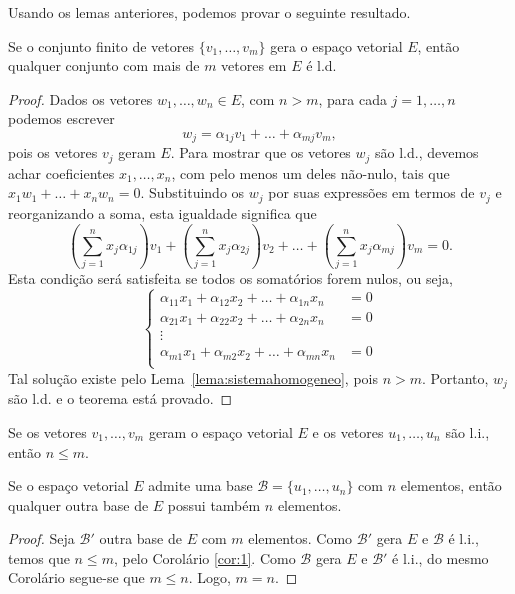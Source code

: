 Usando os lemas anteriores, podemos provar o seguinte resultado.

\begin{teo}\label{teo:33}
  Se o conjunto finito de vetores $\{v_1,\ldots,v_m\}$ gera o espaço vetorial $E$, então qualquer conjunto com mais de $m$ vetores em $E$ é l.d.
\end{teo}
\begin{proof}
Dados os vetores $w_1,\ldots,w_n\in E$, com $n>m$, para cada $j=1,\ldots,n$ podemos escrever
\begin{equation*}
	w_j = \alpha_{1j}v_1 + \ldots + \alpha_{mj}v_m,
\end{equation*}
pois os vetores $v_j$ geram $E$. Para mostrar que os vetores $w_j$ são l.d., devemos achar coeficientes $x_1,\ldots,x_n$, com pelo menos um deles não-nulo, tais que $x_1w_1+\ldots+x_nw_n=0$. Substituindo os $w_j$ por suas expressões em termos de $v_j$ e reorganizando a soma, esta igualdade significa que
\begin{equation*}
  \left( \sum_{j=1}^n x_j \alpha_{1j} \right) v_1 + \left( \sum_{j=1}^n x_j \alpha_{2j} \right) v_2 + \ldots +\left( \sum_{j=1}^n x_j \alpha_{mj} \right) v_m =0.
\end{equation*}
Esta condição será satisfeita se todos os somatórios forem nulos, ou seja,
\begin{equation*}
  \begin{cases}
    \alpha_{11}x_1 + \alpha_{12}x_2 + \ldots + \alpha_{1n}x_n &= 0\\
    \alpha_{21}x_1 + \alpha_{22}x_2 + \ldots + \alpha_{2n}x_n &= 0\\
    \vdots &  \\
    \alpha_{m1}x_1 + \alpha_{m2}x_2 + \ldots + \alpha_{mn}x_n &= 0\\
  \end{cases}
\end{equation*}
Tal solução existe pelo Lema~\ref{lema:sistemahomogeneo}, pois $n>m$. Portanto, $w_j$ são l.d. e o teorema está provado.
\end{proof}

\begin{coro}\label{cor:1}
  Se os vetores $v_1,\ldots,v_m$ geram o espaço vetorial $E$ e os vetores $u_1,\ldots,u_n$ são l.i., então $n\leq m$.
\end{coro}

\begin{coro}
  Se o espaço vetorial $E$ admite uma base ${\mathcal{B}}=\{ u_1,\ldots,u_n\}$ com $n$ elementos, então qualquer outra base de $E$ possui também $n$ elementos.
\end{coro}
\begin{proof}
Seja ${\mathcal{B}}'$ outra base de $E$ com $m$ elementos. Como ${\mathcal{B}}'$ gera $E$ e ${\mathcal{B}}$ é l.i., temos que $n\leq m$, pelo Corolário \ref{cor:1}. Como ${\mathcal{B}}$ gera $E$ e ${\mathcal{B}}'$ é l.i., do mesmo Corolário segue-se que $m\leq n$. Logo, $m=n$.
\end{proof}

